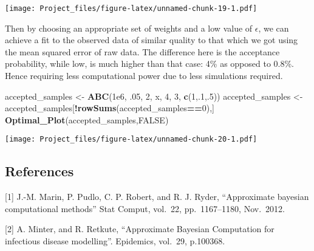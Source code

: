 \documentclass[
]{article}
\newenvironment{Shaded}{\begin{snugshade}}{\end{snugshade}}
\newcommand{\ConstantTok}[1]{\textcolor[rgb]{0.56,0.35,0.01}{#1}}
\newcommand{\DecValTok}[1]{\textcolor[rgb]{0.00,0.00,0.81}{#1}}
\newcommand{\FloatTok}[1]{\textcolor[rgb]{0.00,0.00,0.81}{#1}}
\newcommand{\FunctionTok}[1]{\textcolor[rgb]{0.13,0.29,0.53}{\textbf{#1}}}
\newcommand{\NormalTok}[1]{#1}
\newcommand{\OtherTok}[1]{\textcolor[rgb]{0.56,0.35,0.01}{#1}}
\newcommand{\SpecialCharTok}[1]{\textcolor[rgb]{0.81,0.36,0.00}{\textbf{#1}}}
\begin{document}
\texttt{[image: Project\_files/figure-latex/unnamed-chunk-19-1.pdf]}

Then by choosing an appropriate set of weights and a low value of
\(\epsilon\), we can achieve a fit to the observed data of similar
quality to that which we got using the mean squared error of raw data.
The difference here is the acceptance probability, while low, is much
higher than that case: 4\% as opposed to 0.8\%. Hence requiring less
computational power due to less simulations required.

\begin{Shaded}
\begin{Highlighting}[]
\NormalTok{accepted\_samples }\OtherTok{\textless{}{-}} \FunctionTok{ABC}\NormalTok{(}\FloatTok{1e6}\NormalTok{, .}\DecValTok{05}\NormalTok{, }\DecValTok{2}\NormalTok{, x, }\DecValTok{4}\NormalTok{, }\DecValTok{3}\NormalTok{, }\FunctionTok{c}\NormalTok{(}\DecValTok{1}\NormalTok{,.}\DecValTok{1}\NormalTok{,.}\DecValTok{5}\NormalTok{))}
\NormalTok{accepted\_samples }\OtherTok{\textless{}{-}}\NormalTok{ accepted\_samples[}\SpecialCharTok{!}\FunctionTok{rowSums}\NormalTok{(accepted\_samples}\SpecialCharTok{==}\DecValTok{0}\NormalTok{),]}
\FunctionTok{Optimal\_Plot}\NormalTok{(accepted\_samples,}\ConstantTok{FALSE}\NormalTok{)}
\end{Highlighting}
\end{Shaded}

\texttt{[image: Project\_files/figure-latex/unnamed-chunk-20-1.pdf]}

\subsection{References}\label{references}

{[}1{]} J.-M. Marin, P. Pudlo, C. P. Robert, and R. J. Ryder,
``Approximate bayesian computational methods'' Stat Comput, vol.~22,
pp.~1167--1180, Nov.~2012.

{[}2{]} A. Minter, and R. Retkute, ``Approximate Bayesian Computation
for infectious disease modelling''. Epidemics, vol.~29, p.100368.
\end{document}
